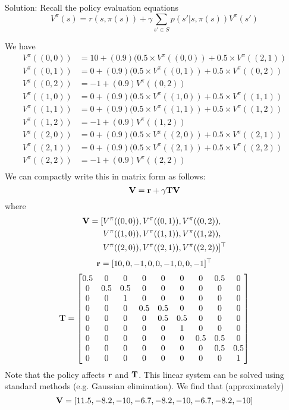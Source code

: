 \documentclass[12pt]{article}
\begin{document}
\begin{solution}
\noindent Solution: Recall the policy
evaluation equations
$$V^\pi(s) = r(s,\pi(s)) + \gamma \sum_{s' \in S} p(s'|s, \pi(s)) V^\pi(s')$$

We have
\begin{align*}
    V^\pi((0,0)) &= 10 + (0.9)(0.5 \times V^\pi((0,0)) + 0.5 \times V^\pi((2,1)) \\
    V^\pi((0,1)) &= 0 + (0.9)(0.5 \times V^\pi((0,1)) + 0.5 \times V^\pi((0,2)) \\
    V^\pi((0,2)) &= -1 + (0.9) V^\pi((0,2))  \\
    V^\pi((1,0)) &= 0 + (0.9)(0.5 \times V^\pi((1,0)) + 0.5 \times V^\pi((1,1)) \\
    V^\pi((1,1)) &= 0 + (0.9)(0.5 \times V^\pi((1,1)) + 0.5 \times V^\pi((1,2)) \\
    V^\pi((1,2)) &= -1 + (0.9) V^\pi((1,2))  \\
    V^\pi((2,0)) &= 0 + (0.9)(0.5 \times V^\pi((2,0)) + 0.5 \times V^\pi((2,1)) \\
    V^\pi((2,1)) &= 0 + (0.9)(0.5 \times V^\pi((2,1)) + 0.5 \times V^\pi((2,2)) \\
    V^\pi((2,2)) &= -1 + (0.9) V^\pi((2,2)) \\
\end{align*}
We can compactly write this in matrix form as follows:
$$\mathbf{V} = \mathbf{r} + \gamma \mathbf{T} \mathbf{V}$$
where
\begin{align*}
    \mathbf{V} = [&V^\pi((0,0)), V^\pi((0,1)), V^\pi((0,2)), \\
&V^\pi((1,0)), V^\pi((1,1)), V^\pi((1,2)), \\
&V^\pi((2,0)), V^\pi((2,1)), V^\pi((2,2))]^\top
\end{align*}
$$\mathbf{r} = [10, 0, -1, 0, 0,-1, 0, 0, -1]^\top $$
$$\mathbf{T} = \begin{bmatrix}
0.5 & 0 & 0 & 0 & 0 & 0 & 0 & 0.5 & 0 \\
0 & 0.5 & 0.5 & 0 & 0 & 0 & 0 & 0 & 0 \\
0 & 0 & 1 & 0 & 0 & 0 & 0 & 0 & 0 \\
0 & 0 & 0 & 0.5 & 0.5 & 0 & 0 & 0 & 0 \\
0 & 0 & 0 & 0 & 0.5 & 0.5 & 0 & 0 & 0 \\
0 & 0 & 0 & 0 & 0 & 1 & 0 & 0 & 0 \\
0 & 0 & 0 & 0 & 0 & 0 & 0.5 & 0.5 & 0 \\
0 & 0 & 0 & 0 & 0 & 0 & 0 & 0.5 & 0.5 \\
0 & 0 & 0 & 0 & 0 & 0 & 0 & 0 & 1 \\
\end{bmatrix}$$
Note that the policy affects $\mathbf{r}$ and $\mathbf{T}$. This linear system can be solved using standard methods (e.g. Gaussian elimination). We find that (approximately)
$$\mathbf{V} = [ 11.5, -8.2, -10, -6.7, -8.2, -10, -6.7, -8.2, -10]$$
\end{solution}
\vspace{10cm}
\end{document}
